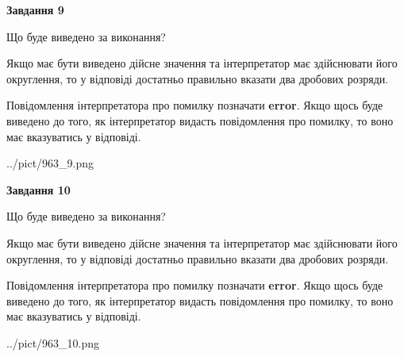 \documentclass[12pt, ukrainian]{article}
\begin{document}
{\begin {Large}
{\begin {center}\textbf{Завдання 9}\end {center}}\par
Що буде виведено за виконання? \par

Якщо має бути виведено дійсне значення та інтерпретатор має здійснювати його округлення, 
то у відповіді достатньо правильно вказати два дробових розряди.

Повідомлення інтерпретатора про помилку позначати \textbf{error}.
Якщо щось буде виведено до того, як інтерпретатор видасть повідомлення про помилку, 
то воно має вказуватись у відповіді. \par

\begin{center}
	{../pict/963_9.png}
\end{center}
\newpage

{\begin {center}\textbf{Завдання 10}\end {center}}\par
Що буде виведено за виконання? \par

Якщо має бути виведено дійсне значення та інтерпретатор має здійснювати його округлення, 
то у відповіді достатньо правильно вказати два дробових розряди.

Повідомлення інтерпретатора про помилку позначати \textbf{error}.
Якщо щось буде виведено до того, як інтерпретатор видасть повідомлення про помилку, 
то воно має вказуватись у відповіді. \par

\begin{center}
	{../pict/963_10.png}
\end{center}
\newpage

\end {Large}}
\end{document}
